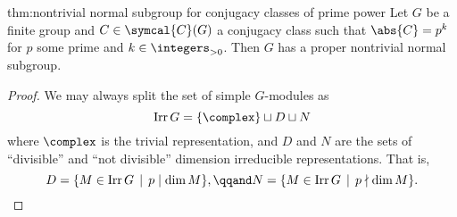 \documentclass[fleqn]{NotesClass}
\DeclareMathOperator{\Irr}{Irr}
\newcommand{\conjugacyClasses}{\symcal{C}}
\begin{document}
    \begin{thm}{}{thm:nontrivial normal subgroup for conjugacy classes of prime power}
        Let \(G\) be a finite group and \(C \in \conjugacyClasses(G)\) a conjugacy class such that \(\abs{C} = p^k\) for \(p\) some prime and \(k \in \integers_{> 0}\).
        Then \(G\) has a proper nontrivial normal subgroup.
        \begin{proof}
            We may always split the set of simple \(G\)-modules as
            \begin{equation}
                \Irr G = \{\complex\} \sqcup D \sqcup N
            \end{equation}
            where \(\complex\) is the trivial representation, and \(D\) and \(N\) are the sets of \enquote{divisible} and \enquote{not divisible} dimension irreducible representations.
            That is,
            \begin{equation}
                D = \{M \in \Irr G \, \mid \, p \mid \dim M\}, \qqand N = \{M \in \Irr G \, \mid \, p \nmid \dim M\}.
            \end{equation}
            

\end{proof}
\end{thm}
\end{document}
